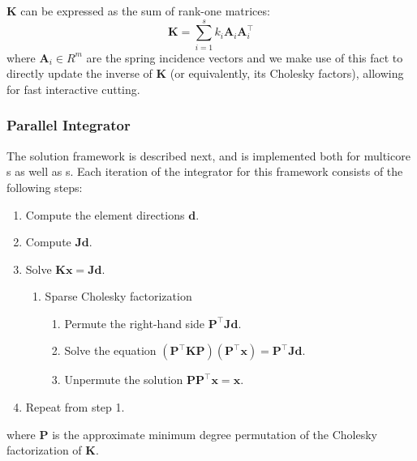 $\mathbf{K}$ can be expressed as the sum of rank-one matrices:
\begin{equation}
  \mathbf{K} = \sum_{i = 1}^s k_i\mathbf{A}_i\mathbf{A}_i^\intercal
\end{equation}
where $\mathbf{A}_i \in R^{m}$ are the spring incidence vectors and we make use of this fact to directly update the inverse of $\mathbf{K}$ (or equivalently, its Cholesky factors), allowing for fast interactive cutting.


\subsubsection{Parallel Integrator}
The solution framework is described next, and is implemented both for multicore s as well as s. Each iteration of the integrator for this framework consists of the following steps:
\begin{enumerate}
  \item Compute the element directions $\mathbf{d}$.
  \item Compute $\mathbf{Jd}$.
  \item Solve $\mathbf{Kx} = \mathbf{Jd}$.
  \begin{enumerate}
    \item Sparse Cholesky factorization
    \begin{enumerate}
      \item Permute the right-hand side $\mathbf{P^\intercal Jd}$.
      \item Solve the equation $\mathbf{(P^\intercal KP)(P^\intercal x)} = \mathbf{P^\intercal Jd}$.
      \item Unpermute the solution $\mathbf{PP^\intercal x} = \mathbf{x}$.
    \end{enumerate}
  \end{enumerate}

  \item Repeat from step 1.
\end{enumerate}
where $\mathbf{P}$ is the approximate minimum degree permutation of the
Cholesky factorization of $\mathbf{K}$.

